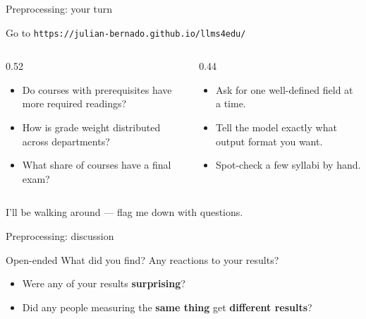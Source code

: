\documentclass[aspectratio=169,t]{beamer}
\newcommand{\appurl}{\texttt{https://julian-bernado.github.io/llms4edu/}}
\begin{document}
\begin{frame}{Preprocessing: your turn}
    \begin{center}
        \Large Go to \appurl
    \end{center}
    \vspace{0.5em}
    \begin{columns}[T,onlytextwidth]
        \begin{column}{0.52\textwidth}
            \textbf{}
            \begin{itemize}
                \item Do courses with prerequisites have more required readings?
                \item How is grade weight distributed across departments?
                \item What share of courses have a final exam?
            \end{itemize}
        \end{column}
        \begin{column}{0.44\textwidth}
            \textbf{}
            \begin{itemize}
                \item Ask for one well-defined field at a time.
                \item Tell the model exactly what output format you want.
                \item Spot-check a few syllabi by hand.
            \end{itemize}
        \end{column}
    \end{columns}
    \vspace{0.5em}
    \begin{center}
        \small I'll be walking around --- flag me down with questions.
    \end{center}
\end{frame}

\begin{frame}{Preprocessing: discussion}
    \begin{block}{Open-ended}
        What did you find? Any reactions to your results?
    \end{block}
    \textbf{}
    \begin{itemize}
        \item Were any of your results \textbf{surprising}?
        \item Did any people measuring the \textbf{same thing} get
              \textbf{different results}?
    \end{itemize}
\end{frame}
\end{document}
